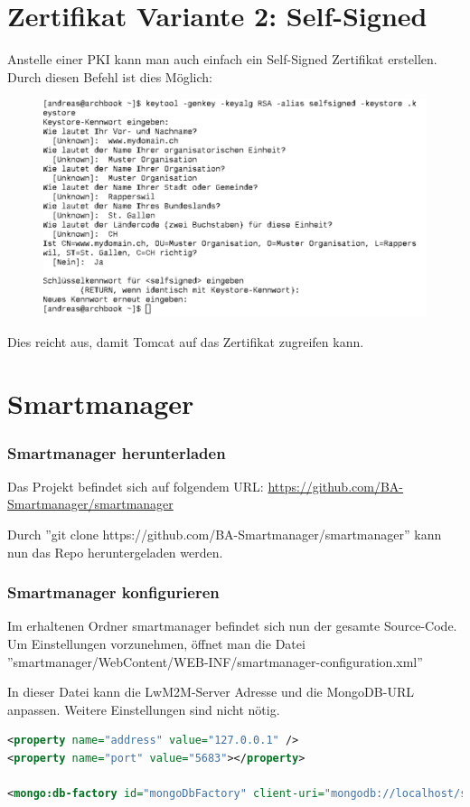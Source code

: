 \section{Zertifikat Variante 2: Self-Signed}
Anstelle einer PKI kann man auch einfach ein Self-Signed Zertifikat erstellen. Durch diesen Befehl ist dies Möglich:
\begin{figure}[H]
\centering
\includegraphics[scale=0.65]{../05_Schlussbericht/images/keystore6.png}
\end{figure}

Dies reicht aus, damit Tomcat auf das Zertifikat zugreifen kann.



\section{Smartmanager}
\subsubsection{Smartmanager herunterladen}
Das Projekt befindet sich auf folgendem URL: \href{https://github.com/BA-Smartmanager/smartmanager}{https://github.com/BA-Smartmanager/smartmanager}

Durch ''git clone https://github.com/BA-Smartmanager/smartmanager'' kann nun das Repo heruntergeladen werden.

\subsubsection{Smartmanager konfigurieren}
Im erhaltenen Ordner smartmanager befindet sich nun der gesamte Source-Code. Um Einstellungen vorzunehmen, öffnet man die Datei ''smartmanager/WebContent/WEB-INF/smartmanager-configuration.xml''

In dieser Datei kann die LwM2M-Server Adresse und die MongoDB-URL anpassen. Weitere Einstellungen sind nicht nötig.
\begin{lstlisting}[language=xml]
<property name="address" value="127.0.0.1" />
<property name="port" value="5683"></property>
		
<mongo:db-factory id="mongoDbFactory" client-uri="mongodb://localhost/smartmanager" />
\end{lstlisting}

